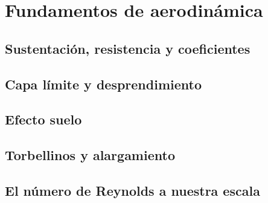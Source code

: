 \chapter{Fundamentos de aerodinámica}
\label{ch:fundamentos_aerodinamica}

\begin{objetivos}
  \item {}
  \item {}
  \item {}
\end{objetivos}


\section{Sustentación, resistencia y coeficientes}
\label{sec:fundamentos_aerodinamica:01}

\section{Capa límite y desprendimiento}
\label{sec:fundamentos_aerodinamica:02}

\section{Efecto suelo}
\label{sec:fundamentos_aerodinamica:03}

\section{Torbellinos y alargamiento}
\label{sec:fundamentos_aerodinamica:04}

\section{El número de Reynolds a nuestra escala}
\label{sec:fundamentos_aerodinamica:05}

